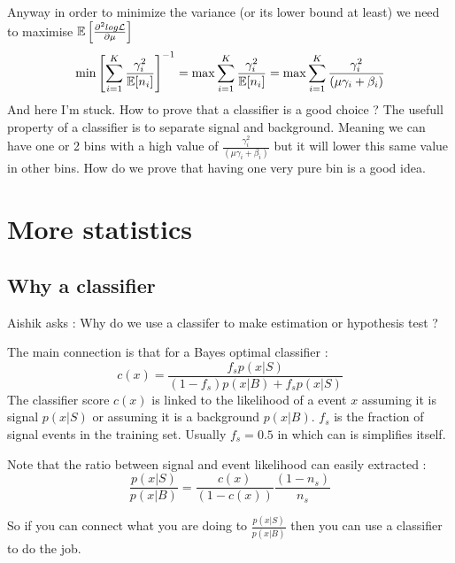 Anyway in order to minimize the variance (or its lower bound at least) we need to maximise $\mathbb{E} \left [ \frac{\partial^2 log \mathcal L}{\partial \mu}  \right ]$ \ie 
\begin{equation}
    \min \left [ \sum_{i=1}^K  \frac{\gamma_i^2}{\mathbb{E}[n_i]} \right ] ^{-1} = \max \sum_{i=1}^K  \frac{\gamma_i^2}{\mathbb{E}[n_i]} = \max \sum_{i=1}^K  \frac{\gamma_i^2}{(\mu \gamma_i + \beta_i)}
\end{equation}
And here I'm stuck.
How to prove that a classifier is a good choice ?
The usefull property of a classifier is to separate signal and background.
Meaning we can have one or 2 bins with a high value of $\frac{\gamma_i^2}{(\mu \gamma_i + \beta_i)}$ but it will lower this same value in other bins. How do we prove that having one very pure bin is a good idea.





\section{More statistics} %
\label{sec:more_statistics}



\subsection{Why a classifier} %
\label{sub:why_a_classifier}

Aishik asks : Why do we use a classifer to make estimation or hypothesis test ?

The main connection is that for a Bayes optimal classifier \needcite : 
\begin{equation}
	c(x) = \frac{f_s p(x|S)}{(1-f_s) p(x|B) + f_s p(x|S)}
\end{equation}
The classifier score $c(x)$ is linked to the likelihood of a event $x$ assuming it is signal $ p(x|S)$ or assuming it is a background $p(x|B)$.
$f_s$ is the fraction of signal events in the training set.
Usually $f_s = 0.5$ in which can is simplifies itself.

Note that the ratio between signal and event likelihood can easily extracted :
\begin{equation}
	\frac{p(x|S)}{p(x|B)} = \frac{c(x)}{(1-c(x))} \frac{(1-n_s)}{n_s} 
\end{equation}

So if you can connect what you are doing to $\frac{p(x|S)}{p(x|B)}$ then you can use a classifier to do the job.

